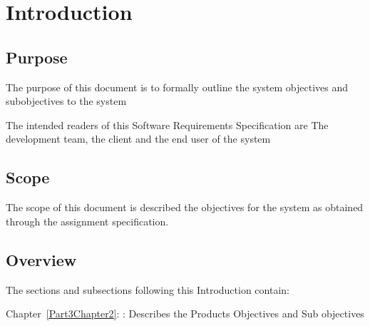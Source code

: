 
\chapter{Introduction} %

\label{Part3Chapter1} %



\section{Purpose}

The purpose of this document is to formally outline the system objectives and subobjectives to the system

The intended readers of this Software Requirements Specification are The development team, the client and the end user of the system


\section{Scope}

The scope of this document is described the objectives for the system as obtained through the assignment specification.



\section{Overview}

The sections and subsections following this Introduction contain:

Chapter~\ref{Part3Chapter2}: : Describes the Products Objectives and Sub objectives